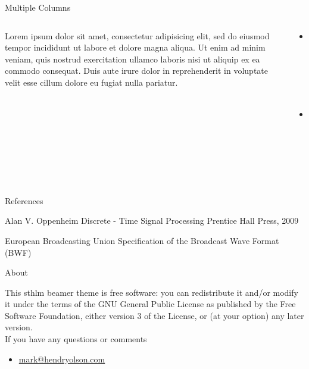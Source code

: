 \documentclass[compress,PxFont]{beamer}
\begin{document}
\begin{frame}{Multiple Columns}
\begin{columns}
\begin{column}{.48\linewidth}
		Lorem ipsum dolor sit amet, consectetur adipisicing elit, sed do eiusmod
		tempor incididunt ut labore et dolore magna aliqua. Ut enim ad minim veniam,
		quis nostrud exercitation ullamco laboris nisi ut aliquip ex ea commodo
		consequat. Duis aute irure dolor in reprehenderit in voluptate velit esse
		cillum dolore eu fugiat nulla pariatur. 
\end{column}
\begin{column}{.48\linewidth}
		\begin{itemize}
        	\item Point 1
        	\item Point 2
		\end{itemize}
	\end{column}
	\end{columns}
\end{frame}

\begin{frame}{References}
	\begin{thebibliography}{10}
    
	\beamertemplatebookbibitems
	Alan V. Oppenheim
	\newblock Discrete - Time Signal Processing
	\newblock Prentice Hall Press, 2009

	\beamertemplatearticlebibitems
	European Broadcasting Union
	\newblock Specification of the Broadcast Wave Format (BWF)
  \end{thebibliography}
\end{frame}

%
%

\begin{frame}{About}
	
This sthlm beamer theme is free software: you can redistribute it and/or modify
it under the terms of the GNU General Public License as published by
the Free Software Foundation, either version 3 of the License, or
(at your option) any later version.\\

If you have any questions or comments
\begin{itemize}
	\item \url{mark@hendryolson.com}
\end{itemize}
\end{frame}
\end{document}
